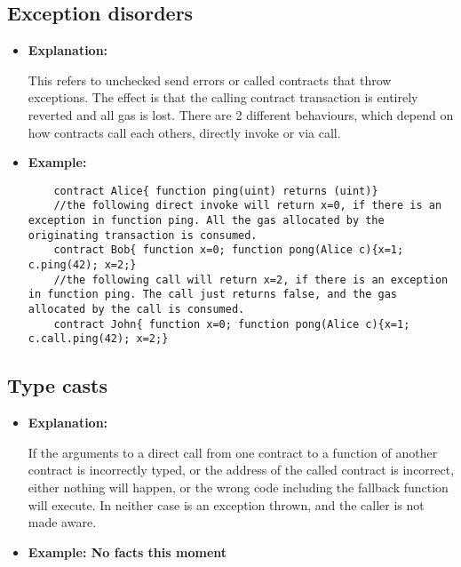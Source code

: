 \documentclass{llncs}
\begin{document}
\subsection{Exception disorders}
\begin{itemize}
\item \textbf{Explanation:} 

This refers to unchecked send errors or called contracts that throw exceptions. The effect is that the calling contract transaction is entirely reverted and all gas is lost. There are 2 different behaviours, which depend on how contracts call each others, directly invoke or via call.
\item \textbf{Example:}

	\begin{minipage}{.5\textwidth} 
	{\scriptsize
	\begin{verbatim}
	contract Alice{ function ping(uint) returns (uint)}
	//the following direct invoke will return x=0, if there is an exception in function ping. All the gas allocated by the originating transaction is consumed.
	contract Bob{ function x=0; function pong(Alice c){x=1; c.ping(42); x=2;}
	//the following call will return x=2, if there is an exception in function ping. The call just returns false, and the gas allocated by the call is consumed.
	contract John{ function x=0; function pong(Alice c){x=1; c.call.ping(42); x=2;}

	\end{verbatim} }
\end{minipage}	
	
\end{itemize}

\subsection{Type casts}
\begin{itemize}
\item \textbf{Explanation:} 

If the arguments to a direct call from one contract to a function of another contract is incorrectly typed, or the address of the called contract is incorrect, either nothing will happen, or the wrong code including the fallback function will execute. In neither case is an exception thrown, and the caller is not made aware.
\item \textbf{Example: No facts this moment}

\end{itemize}
\end{document}

